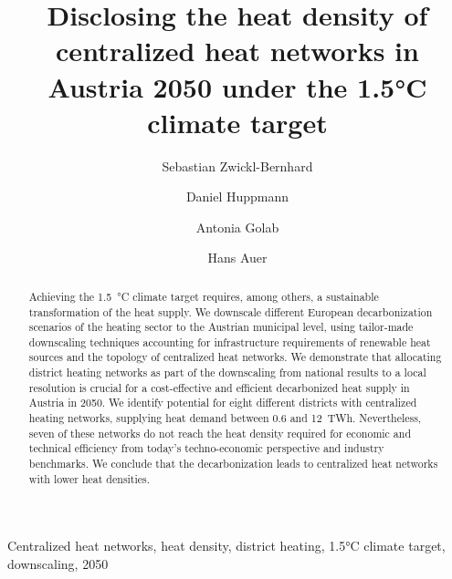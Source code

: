 \documentclass[review]{elsarticle}
\begin{document}
\begin{frontmatter}

\title{Disclosing the heat density of centralized heat networks in Austria 2050 under the 1.5°C climate target}
\author[1,2]{Sebastian Zwickl-Bernhard}
\author[2]{Daniel Huppmann}
\author[1]{Antonia Golab}
\author[1]{Hans Auer}
\address[1]{Energy Economics Group (EEG), Technische Universität Wien, Gusshausstrasse 25-29/E370-3, 1040 Wien, Austria}
\address[2]{Energy, Climate and Environment (ECE) Program,  International Institute for Applied Systems Analysis (IIASA), Laxenburg, Austria}

\begin{abstract}
	Achieving the \SI{1.5}{\degreeCelsius} climate target requires, among others, a sustainable transformation of the heat supply. We downscale different European decarbonization scenarios of the heating sector to the Austrian municipal level, using tailor-made downscaling techniques accounting for infrastructure requirements of renewable heat sources and the topology of centralized heat networks.
	We demonstrate that allocating district heating networks as part of the downscaling from national results to a local resolution is crucial for a cost-effective and efficient decarbonized heat supply in Austria in 2050. We identify potential for eight different districts with centralized heating networks, supplying heat demand between \SI{0.6}{} and \SI{12}{TWh}. Nevertheless, seven of these networks do not reach the heat density required for economic and technical efficiency from today's techno-economic perspective and industry benchmarks. We conclude that the decarbonization leads to centralized heat networks with lower heat densities.
\end{abstract}

\begin{keyword}
	Centralized heat networks, heat density, district heating, 1.5°C climate target, downscaling, 2050
\end{keyword}
\end{frontmatter}

\newpage
\end{document}
